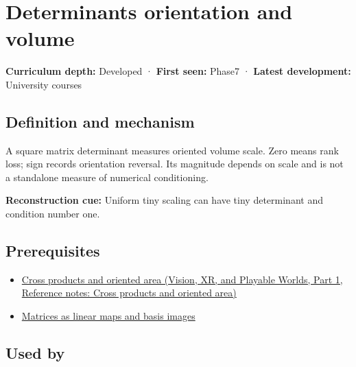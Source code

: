\hypertarget{appendix-da478be01d02}{}\label{referencestart:appendix-da478be01d02}
\section{Determinants orientation and volume}\label{appendix-da478be01d02-determinants-orientation-and-volume}

\hypertarget{appendix-da478be01d02-determinants-orientation-and-volume}{}

\textbf{Curriculum depth:} Developed · \textbf{First seen:} Phase7 · \textbf{Latest development:} University courses

\begin{allmightroledefinition}

\subsection{Definition and mechanism}\label{appendix-da478be01d02-definition-and-mechanism}

\hypertarget{appendix-da478be01d02-definition-and-mechanism}{}

A square matrix determinant measures oriented volume scale. Zero means rank loss; sign records orientation reversal. Its magnitude depends on scale and is not a standalone measure of numerical conditioning.

\end{allmightroledefinition}

\textbf{Reconstruction cue:} Uniform tiny scaling can have tiny determinant and condition number one.

\subsection{Prerequisites}\label{appendix-da478be01d02-prerequisites}

\hypertarget{appendix-da478be01d02-prerequisites}{}

\begin{itemize}
\tightlist
\item
  \href{../07-Vision-XR-and-Playable-Worlds-P01/main.pdf\#nameddest=appendix-2391db8052b1}{Cross products and oriented area (Vision, XR, and Playable Worlds, Part 1, Reference notes: Cross products and oriented area)}
\item
  \hyperref[appendix-bd39c3bf5d64]{Matrices as linear maps and basis images}
\end{itemize}

\subsection{Used by}\label{appendix-da478be01d02-used-by}

